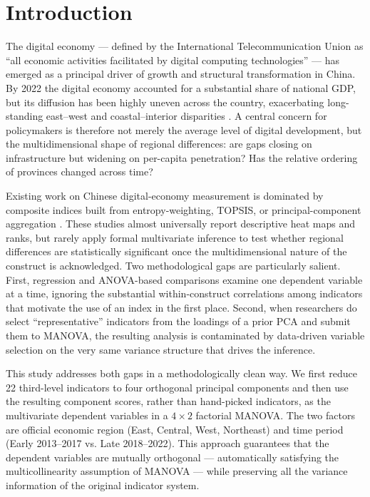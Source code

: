 \documentclass[12pt,letterpaper]{article}
\begin{document}
\section{Introduction}

The digital economy --- defined by the International Telecommunication Union as ``all economic activities facilitated by digital computing technologies'' --- has emerged as a principal driver of growth and structural transformation in China.  By 2022 the digital economy accounted for a substantial share of national GDP, but its diffusion has been highly uneven across the country, exacerbating long-standing east--west and coastal--interior disparities \citep{he2023}.  A central concern for policymakers is therefore not merely the average level of digital development, but the {multidimensional} shape of regional differences: are gaps closing on infrastructure but widening on per-capita penetration?  Has the relative ordering of provinces changed
across time?

Existing work on Chinese digital-economy measurement is dominated by composite indices built from entropy-weighting, TOPSIS, or principal-component aggregation \citep{bai2024}.  These studies almost universally report descriptive heat maps and ranks, but rarely apply formal multivariate inference to test whether regional differences are statistically significant once the multidimensional nature of the construct is acknowledged.  Two methodological gaps are particularly salient.  First, regression and ANOVA-based comparisons examine one
dependent variable at a time, ignoring the substantial within-construct
correlations among indicators that motivate the use of an index in the first place.  Second, when researchers do select ``representative'' indicators from the loadings of a prior PCA and submit them to MANOVA, the resulting analysis is contaminated by data-driven variable selection on the very same variance structure that drives the inference.

This study addresses both gaps in a methodologically clean way.  We first reduce 22 third-level indicators to four orthogonal principal components and then use the resulting {component scores}, rather than hand-picked indicators, as the multivariate dependent variables in a $4 \times 2$ factorial MANOVA. The two factors are official economic region (East, Central, West, Northeast) and time period (Early 2013--2017 vs. Late 2018--2022).  This approach \citep{tabachnick2019} guarantees that the dependent variables are mutually orthogonal --- automatically satisfying the multicollinearity assumption of MANOVA --- while preserving all the variance information of the original indicator system.
\end{document}
